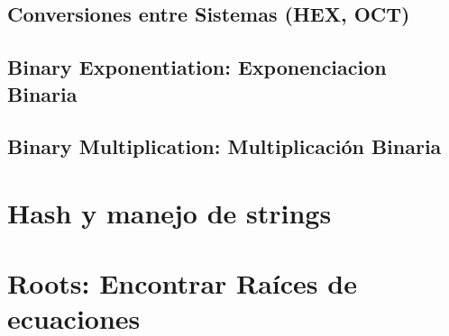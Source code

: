 \documentclass[12pt, fleqn]{report}                             %
\theoremstyle{break}                                            %
\begin{document}
        \section{Conversiones entre Sistemas (HEX, OCT)}

        \section{Binary Exponentiation: Exponenciacion Binaria}

        \section{Binary Multiplication: Multiplicación Binaria}


    \clearpage
    \chapter{Hash y manejo de strings}


    \clearpage
    \chapter{Roots: Encontrar Raíces de ecuaciones}

\end{document}
